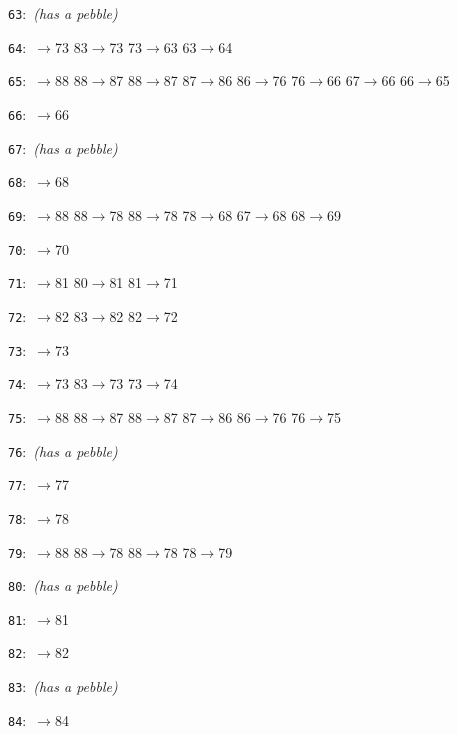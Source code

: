 \documentclass[11pt]{amsart}
\begin{document}
\begin{flushleft}
\noindent\texttt{63}:\ {\footnotesize\ttfamily \textrm{\itshape (has a pebble)}}\par
\noindent\texttt{64}:\ {\footnotesize{}$\to$73 83$\to$73 73$\to$63 63$\to$64}\par
\noindent\texttt{65}:\ {\footnotesize{}$\to$88 88$\to$87 88$\to$87 87$\to$86 86$\to$76 76$\to$66 67$\to$66 66$\to$65}\par
\noindent\texttt{66}:\ {\footnotesize{}$\to$66}\par
\noindent\texttt{67}:\ {\footnotesize\ttfamily \textrm{\itshape (has a pebble)}}\par
\noindent\texttt{68}:\ {\footnotesize{}$\to$68}\par
\noindent\texttt{69}:\ {\footnotesize{}$\to$88 88$\to$78 88$\to$78 78$\to$68 67$\to$68 68$\to$69}\par
\noindent\texttt{70}:\ {\footnotesize{}$\to$70}\par
\noindent\texttt{71}:\ {\footnotesize{}$\to$81 80$\to$81 81$\to$71}\par
\noindent\texttt{72}:\ {\footnotesize{}$\to$82 83$\to$82 82$\to$72}\par
\noindent\texttt{73}:\ {\footnotesize{}$\to$73}\par
\noindent\texttt{74}:\ {\footnotesize{}$\to$73 83$\to$73 73$\to$74}\par
\noindent\texttt{75}:\ {\footnotesize{}$\to$88 88$\to$87 88$\to$87 87$\to$86 86$\to$76 76$\to$75}\par
\noindent\texttt{76}:\ {\footnotesize\ttfamily \textrm{\itshape (has a pebble)}}\par
\noindent\texttt{77}:\ {\footnotesize{}$\to$77}\par
\noindent\texttt{78}:\ {\footnotesize{}$\to$78}\par
\noindent\texttt{79}:\ {\footnotesize{}$\to$88 88$\to$78 88$\to$78 78$\to$79}\par
\noindent\texttt{80}:\ {\footnotesize\ttfamily \textrm{\itshape (has a pebble)}}\par
\noindent\texttt{81}:\ {\footnotesize{}$\to$81}\par
\noindent\texttt{82}:\ {\footnotesize{}$\to$82}\par
\noindent\texttt{83}:\ {\footnotesize\ttfamily \textrm{\itshape (has a pebble)}}\par
\noindent\texttt{84}:\ {\footnotesize{}$\to$84}\par

\end{flushleft}
\end{document}
